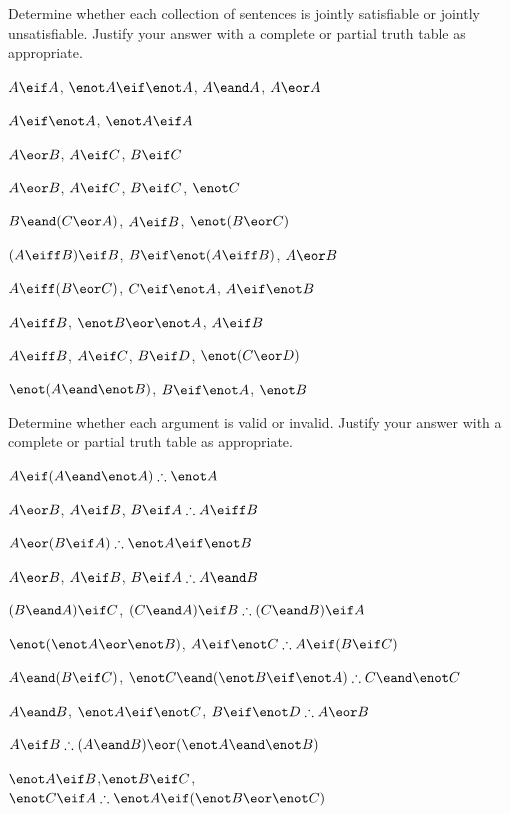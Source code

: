 \noindent\problempart
\label{pr.TT.satisfiable5}
Determine whether each collection of sentences is jointly satisfiable or jointly unsatisfiable. Justify your answer with a complete or partial truth table as appropriate.
\begin{compactlist}
\item $A\eif A$, $\enot A \eif \enot A$, $A\eand A$, $A\eor A$ %
\item $A \eif \enot A$, $\enot A \eif A$%
\item $A\eor B$, $A\eif C$, $B\eif C$ %
\item $A \eor B$, $A \eif C$, $B \eif C$, $\enot C$ %
\item $B\eand(C\eor A)$, $A\eif B$, $\enot(B\eor C)$  %
\item $(A \eiff B) \eif B$,  $B \eif \enot (A \eiff B)$, $A \eor B$  %
\item $A\eiff(B\eor C)$, $C\eif \enot A$, $A\eif \enot B$ %
\item  $A \eiff B$,  $\enot B \eor \enot A$,  $A \eif  B$ %
\item $A \eiff B$, $A \eif C$, $B \eif D$, $\enot(C \eor D)$ %
\item $\enot (A \eand \enot B)$,  $B \eif \enot A$, $\enot B$   %
\end{compactlist}

\noindent\problempart Determine whether each argument is valid or invalid. Justify your answer with a complete or partial truth table as appropriate.
\label{pr.TT.valid5} 
\begin{compactlist}
\item $A\eif(A\eand\enot A)\therefore \enot A$%
\item $A \eor B$, $A \eif B$, $B \eif A \therefore  A \eiff B$  %
\item $A\eor(B\eif A)\therefore \enot A \eif \enot B$ %
\item $A \eor B$, $A \eif B$, $ B \eif A \therefore  A \eand B$ %
\item $(B\eand A)\eif C$, $(C\eand A)\eif B\therefore (C\eand B)\eif A$ %
\item $\enot (\enot A \eor \enot B)$, $A \eif \enot C \therefore  A \eif (B \eif C)$ %
\item $A \eand (B \eif C)$, $\enot C \eand (\enot B \eif \enot A)\therefore C \eand \enot C$ %
\item $A \eand B$, $\enot A \eif \enot C$, $B \eif \enot D \therefore  A \eor B$ %
\item $A \eif B\therefore (A \eand B) \eor (\enot A \eand \enot B)$ %
\item $\enot A \eif B$,$ \enot B \eif C $,$ \enot C \eif A \therefore  \enot A \eif (\enot B \eor \enot C) $%

\end{compactlist}

